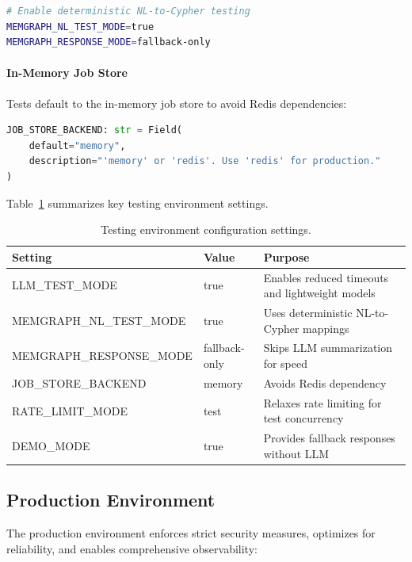 \begin{lstlisting}[language=bash, caption=Test mode configuration for Memgraph NL]
# Enable deterministic NL-to-Cypher testing
MEMGRAPH_NL_TEST_MODE=true
MEMGRAPH_RESPONSE_MODE=fallback-only
\end{lstlisting}

\paragraph{In-Memory Job Store}
Tests default to the in-memory job store to avoid Redis dependencies:

\begin{lstlisting}[language=Python, caption=Job store backend configuration]
JOB_STORE_BACKEND: str = Field(
    default="memory",
    description="'memory' or 'redis'. Use 'redis' for production."
)
\end{lstlisting}

Table~\ref{tab:test-env-settings} summarizes key testing environment settings.

\begin{table}[ht]
\centering
\caption{Testing environment configuration settings.}
\label{tab:test-env-settings}
\begin{tabular}{llp{6cm}}
\hline
\textbf{Setting} & \textbf{Value} & \textbf{Purpose} \\
\hline
LLM\_TEST\_MODE & true & Enables reduced timeouts and lightweight models \\
MEMGRAPH\_NL\_TEST\_MODE & true & Uses deterministic NL-to-Cypher mappings \\
MEMGRAPH\_RESPONSE\_MODE & fallback-only & Skips LLM summarization for speed \\
JOB\_STORE\_BACKEND & memory & Avoids Redis dependency \\
RATE\_LIMIT\_MODE & test & Relaxes rate limiting for test concurrency \\
DEMO\_MODE & true & Provides fallback responses without LLM \\
\hline
\end{tabular}
\end{table}

\subsection{Production Environment}

The production environment enforces strict security measures, optimizes for reliability, and enables comprehensive observability:

